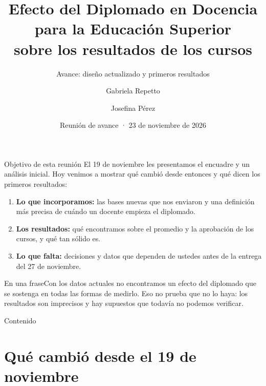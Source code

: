 \documentclass[10pt,aspectratio=169]{beamer}
\title[Efecto del diplomado: avance]{Efecto del Diplomado en Docencia para la Educación Superior\\ sobre los resultados de los cursos}
\subtitle{Avance: diseño actualizado y primeros resultados}
\author[G. Repetto y J. Pérez]{Gabriela Repetto \and Josefina Pérez}
\institute[ICS3564]{ICS3564 Econometría Avanzada\\ Pontificia Universidad Católica de Chile}
\date[23 nov 2026]{Reunión de avance · 23 de noviembre de 2026}
\newcommand{\sintesis}[2]{%
  \begin{block}{#1}#2\end{block}}
\begin{document}
\begin{frame}
  \titlepage
\end{frame}

\begin{frame}{Objetivo de esta reunión}
  El 19 de noviembre les presentamos el encuadre y un análisis inicial. Hoy venimos a mostrar \alert{qué cambió desde entonces} y \alert{qué dicen los primeros resultados}:
  \vspace{0.6em}
  \begin{enumerate}
    \item \textbf{Lo que incorporamos:} las bases nuevas que nos enviaron y una definición más precisa de cuándo un docente empieza el diplomado.
    \item \textbf{Los resultados:} qué encontramos sobre el promedio y la aprobación de los cursos, y qué tan sólido es.
    \item \textbf{Lo que falta:} decisiones y datos que dependen de ustedes antes de la entrega del 27 de noviembre.
  \end{enumerate}
  \vspace{0.6em}
  \sintesis{En una frase}{Con los datos actuales no encontramos un efecto del diplomado que se sostenga en todas las formas de medirlo. Eso no prueba que no lo haya: los resultados son imprecisos y hay supuestos que todavía no podemos verificar.}
\end{frame}

\begin{frame}{Contenido}
  \tableofcontents
\end{frame}

\section{Qué cambió desde el 19 de noviembre}
\end{document}
